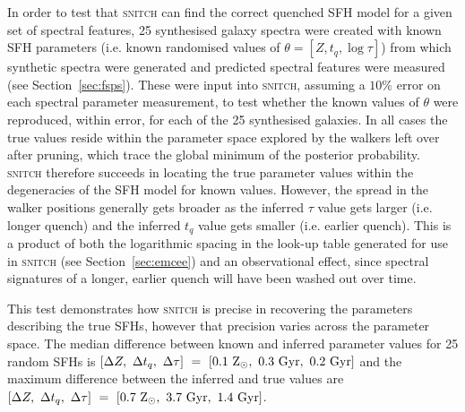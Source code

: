 \documentclass[useAMS,usenatbib]{mn2e}
\begin{document}
In order to test that \textsc{snitch} can find the correct quenched SFH model for a given set of spectral features, 25 synthesised galaxy spectra were created with known SFH parameters (i.e. known randomised values of $\theta = [Z, t_q, \log \tau]$) from which synthetic spectra were generated and predicted spectral features were measured (see Section~\ref{sec:fsps}). These were input into \textsc{snitch}, assuming a $10\%$ error on each spectral parameter measurement, to test whether the known values of $\theta$ were reproduced, within error, for each of the 25 synthesised galaxies. %
In all cases the true values reside within the parameter space explored by the walkers left over after pruning, which trace the global minimum of the posterior probability. \textsc{snitch} therefore succeeds in locating the true parameter values within the degeneracies of the SFH model for known values. However, the spread in the walker positions generally gets broader as the inferred $\tau$ value gets larger (i.e. longer quench) and the inferred $t_q$ value gets smaller (i.e. earlier quench). This is a product of both the logarithmic spacing in the look-up table generated for use in \textsc{snitch} (see Section~\ref{sec:emcee}) and an observational effect, since spectral signatures of a longer, earlier quench will have been washed out over time. 

This test demonstrates how \textsc{snitch} is precise in recovering the parameters describing the true SFHs, however that precision varies across the parameter space. The median difference between known and inferred parameter values for 25 random SFHs is $[\Delta Z,~\Delta t_q,~\Delta \tau]~=~[0.1~\rm{Z}_{\odot},~0.3~\rm{Gyr},~0.2~\rm{Gyr}]$ and the maximum difference between the inferred and true values are $[\Delta Z,~\Delta t_q,~\Delta \tau]~=~[0.7~\rm{Z}_{\odot},~3.7~\rm{Gyr},~1.4~\rm{Gyr}]$.
\end{document}
